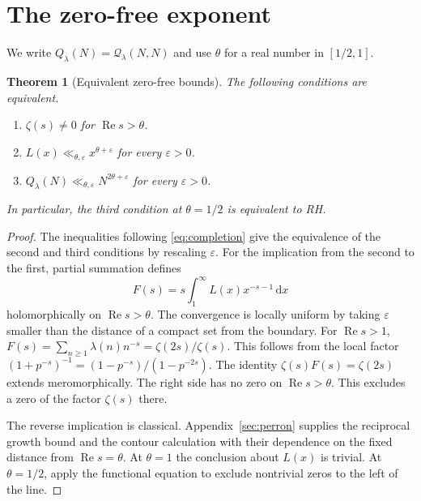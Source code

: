 \documentclass[11pt]{amsart}
\newtheorem{theorem}{Theorem}[section]
\theoremstyle{definition}
\theoremstyle{remark}
\newcommand{\Q}{\mathcal Q}
\newcommand{\R}{\operatorname{Re}}
\newcommand{\dd}{\,\mathrm d}
\numberwithin{equation}{section}
\begin{document}
\section{The zero-free exponent}\label{sec:zero}

We write \(Q_\lambda(N)=\Q_\lambda(N,N)\) and use \(\theta\) for a real number in \([1/2,1]\).

\begin{theorem}[Equivalent zero-free bounds]\label{thm:equiv}
The following conditions are equivalent.
\begin{enumerate}
\item \(\zeta(s)\ne0\) for \(\R s>\theta\).
\item \(L(x)\ll_{\theta,\varepsilon} x^{\theta+\varepsilon}\) for every \(\varepsilon>0\).
\item \(Q_\lambda(N)\ll_{\theta,\varepsilon} N^{2\theta+\varepsilon}\) for every \(\varepsilon>0\).
\end{enumerate}
In particular, the third condition at \(\theta=1/2\) is equivalent to RH.
\end{theorem}
\begin{proof}
The inequalities following \eqref{eq:completion} give the equivalence of the second and third conditions by rescaling \(\varepsilon\). For the implication from the second to the first, partial summation defines
\[
 F(s)=s\int_1^\infty L(x)x^{-s-1}\dd x
\]
holomorphically on \(\R s>\theta\). The convergence is locally uniform by taking \(\varepsilon\) smaller than the distance of a compact set from the boundary. For \(\R s>1\), \(F(s)=\sum_{n\ge1}\lambda(n)n^{-s}=\zeta(2s)/\zeta(s)\). This follows from the local factor \((1+p^{-s})^{-1}=(1-p^{-s})/(1-p^{-2s})\). The identity \(\zeta(s)F(s)=\zeta(2s)\) extends meromorphically. The right side has no zero on \(\R s>\theta\). This excludes a zero of the factor \(\zeta(s)\) there.

The reverse implication is classical. Appendix~\ref{sec:perron} supplies the reciprocal growth bound and the contour calculation with their dependence on the fixed distance from \(\R s=\theta\). At \(\theta=1\) the conclusion about \(L(x)\) is trivial. At \(\theta=1/2\), apply the functional equation to exclude nontrivial zeros to the left of the line.
\end{proof}
\end{document}
